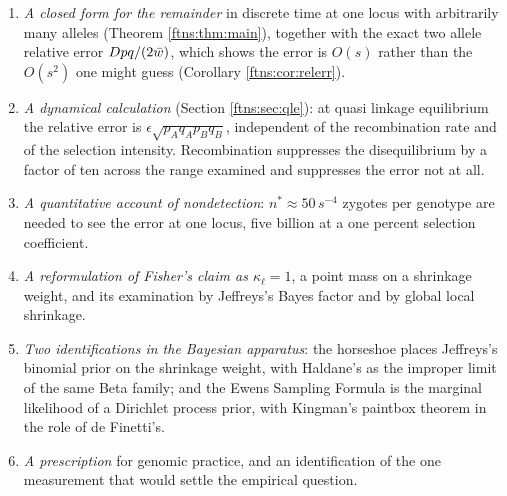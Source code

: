 \begin{enumerate}
\item \emph{A closed form for the remainder} in discrete time at one locus with arbitrarily many
alleles (Theorem \ref{ftns:thm:main}), together with the exact two allele relative error
$Dpq/(2\bar{w})$, which shows the error is $O(s)$ rather than the $O(s^2)$ one might guess
(Corollary \ref{ftns:cor:relerr}).

\item \emph{A dynamical calculation} (Section \ref{ftns:sec:qle}): at quasi linkage equilibrium the
relative error is $\epsilon\sqrt{p_Aq_Ap_Bq_B}$, independent of the recombination rate and of the
selection intensity. Recombination suppresses the disequilibrium by a factor of ten across the
range examined and suppresses the error not at all.

\item \emph{A quantitative account of nondetection}: $n^\ast\approx50\,s^{-4}$ zygotes per
genotype are needed to see the error at one locus, five billion at a one percent selection
coefficient.

\item \emph{A reformulation of Fisher's claim as $\kappa_\ell=1$}, a point mass on a shrinkage
weight, and its examination by Jeffreys's Bayes factor and by global local shrinkage.

\item \emph{Two identifications in the Bayesian apparatus}: the horseshoe places Jeffreys's
binomial prior on the shrinkage weight, with Haldane's as the improper limit of the same Beta
family; and the Ewens Sampling Formula is the marginal likelihood of a Dirichlet process prior,
with Kingman's paintbox theorem in the role of de Finetti's.

\item \emph{A prescription} for genomic practice, and an identification of the one measurement
that would settle the empirical question.
\end{enumerate}

\medskip

